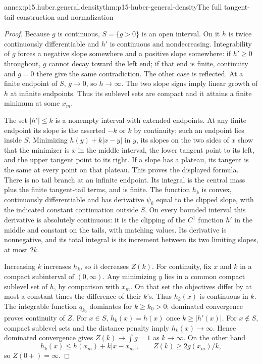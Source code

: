 \begin{annexitem}{annex:p15.huber.general.density}{thm:p15-huber-general-density}{The full tangent-tail construction and normalization}
\begin{proof}
Because \(g\) is continuous, \(S=\{g>0\}\) is an open interval.
On it \(h\) is twice continuously differentiable and \(h'\) is
continuous and nondecreasing. Integrability of \(g\) forces a negative
slope somewhere and a positive slope somewhere: if \(h'\geq0\)
throughout, \(g\) cannot decay toward the left end; if that end is
finite, continuity and \(g=0\) there give the same contradiction.
The other case is reflected. At a finite endpoint of \(S\),
\(g\to0\), so \(h\to\infty\). The two slope signs imply linear
growth of \(h\) at infinite endpoints. Thus its sublevel sets
are compact and it attains a finite minimum at some \(x_m\).

The set \(|h'|\leq k\) is a nonempty interval with extended endpoints.
At any finite endpoint its slope is the asserted \(-k\) or \(k\)
by continuity; such an endpoint lies inside \(S\).
Minimizing \(h(y)+k|x-y|\) in \(y\), its slopes on the two sides
of \(x\) show that the minimizer is \(x\) in the middle interval,
the lower tangent point to its left, and the upper tangent point
to its right. If a slope has a plateau, its tangent is the same
at every point on that plateau. This proves the displayed formula.
There is no tail branch at an infinite endpoint.
Its integral is the central mass plus the finite tangent-tail
terms, and is finite. The function \(h_k\) is convex, continuously
differentiable and has derivative \(\psi_k\) equal to the clipped
slope, with the indicated constant continuation outside \(S\).
On every bounded interval this derivative is absolutely continuous:
it is the clipping of the \(C^1\) function \(h'\) in the middle
and constant on the tails, with matching values. Its derivative
is nonnegative, and its total integral is its increment between
its two limiting slopes, at most \(2k\).

Increasing \(k\) increases \(h_k\), so it decreases \(Z(k)\).
For continuity, fix \(x\) and \(k\) in a compact subinterval of
\((0,\infty)\). Any minimizing \(y\) lies in a common compact
sublevel set of \(h\), by comparison with \(x_m\).
On that set the objectives differ by at most a constant times
the difference of their \(k\)'s. Thus \(h_k(x)\) is continuous in \(k\).
The integrable function \(q_{k_0}\) dominates for \(k\geq k_0>0\);
dominated convergence proves continuity of \(Z\).
For \(x\in S\), \(h_k(x)=h(x)\) once \(k\geq|h'(x)|\).
For \(x\notin S\), compact sublevel sets and the distance penalty
imply \(h_k(x)\to\infty\). Hence dominated convergence gives
\(Z(k)\to\int g=1\) as \(k\to\infty\).
On the other hand
\[
 h_k(x)\leq h(x_m)+k|x-x_m|,\qquad
 Z(k)\geq2g(x_m)/k,
\]
so \(Z(0+)=\infty\).


\end{proof}
\end{annexitem}
